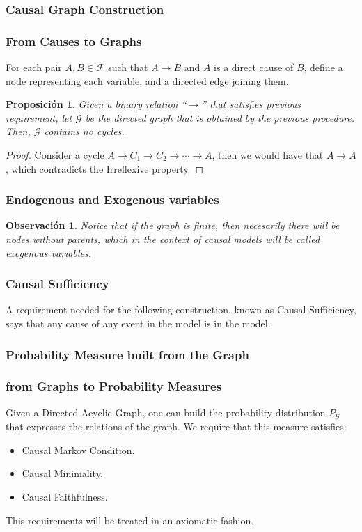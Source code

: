 \documentclass{beamer}
\theoremstyle{plain}
\newtheorem{prop}[teo]{Proposición}
\newtheorem{obs}[teo]{Observación}
\begin{document}
		\subsubsection{Causal Graph Construction}
		\begin{frame}
		\frametitle{From Causes to Graphs}
		For each pair $A,B \in \mathcal{F}$ such that $A \to B$ and $A$ is a direct cause of $B$, define a node representing each variable, and a directed edge joining them.
		\begin{prop}
		Given a binary relation “$\to$” that satisfies previous requirement, let $\mathcal{G}$ be the directed graph that is obtained by the previous procedure. Then, $\mathcal{G}$ contains no cycles.
		\end{prop}
		\begin{proof}
		Consider a cycle $A \to C_1 \to C_2 \to \cdots \to A$, then we would have that $A \to A$, which contradicts the Irreflexive property.
		\end{proof}
		\end{frame}
		
		\begin{frame}
		\frametitle{Endogenous and Exogenous variables}
		\begin{obs}
		Notice that if the graph is finite, then necesarily there will be nodes without parents, which in the context of causal models will be called exogenous variables.
		\end{obs}
		\end{frame}
		
		\begin{frame}
		\frametitle{Causal Sufficiency}
		A requirement needed for the following construction, known as Causal Sufficiency, says that any cause of any event in the model is in the model. 
		\end{frame}
		
		\subsubsection{Probability Measure built from the Graph}
		\begin{frame}
		\frametitle{from Graphs to Probability Measures}
		Given a Directed Acyclic Graph, one can build the probability distribution $P_\mathcal{G}$ that expresses the relations of the graph. We require that this measure satisfies:
        \begin{itemize}
        \item Causal Markov Condition.
        \item Causal Minimality.
         \item Causal Faithfulness.
        \end{itemize}
         This requirements will be treated in an axiomatic fashion.
		\end{frame}
		
\end{document}
